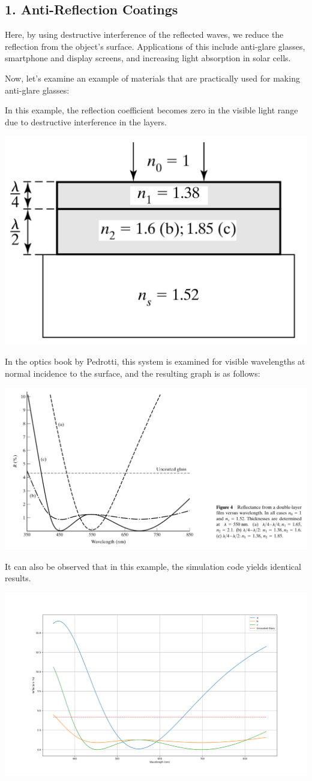 \documentclass{article}
\begin{document}
	\subsection*{1. Anti-Reflection Coatings}
	
	
	Here, by using destructive interference of the reflected waves, we reduce the reflection from the object's surface. Applications of this include anti-glare glasses, smartphone and display screens, and increasing light absorption in solar cells.
    
	Now, let's examine an example of materials that are practically used for making anti-glare glasses:
	
	In this example, the reflection coefficient becomes zero in the visible light range due to destructive interference in the layers.
	
	\begin{center}
		\includegraphics[height=.3\linewidth]{image_2025-07-16_20-45-14}
	\end{center}
	In the optics book by Pedrotti, this system is examined for visible wavelengths at normal incidence to the surface, and the resulting graph is as follows:
	\begin{center}
		\includegraphics[height=.5\linewidth]{image_2025-07-16_20-39-13}
	\end{center}
	\newpage
	It can also be observed that in this example, the simulation code yields identical results.
	\begin{center}
		\includegraphics[height=.5\linewidth]{fig1}
	\end{center}
	
\end{document}
